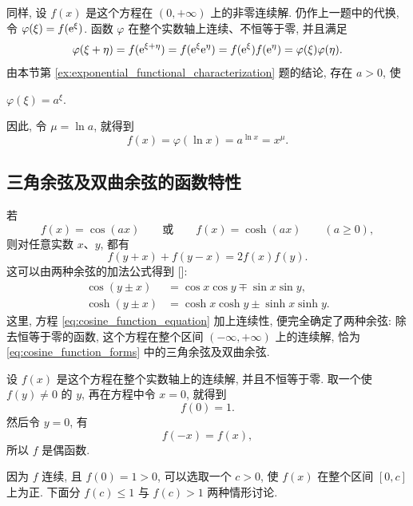 同样, 设 $f(x)$ 是这个方程在 $(0,+\infty)$ 上的非零连续解.
仍作上一题中的代换, 令 $\varphi(\xi)=f(\mathrm{e}^\xi)$.
函数 $\varphi$ 在整个实数轴上连续、不恒等于零, 并且满足
$$
\varphi(\xi+\eta)
=f(\mathrm{e}^{\xi+\eta})=f(\mathrm{e}^\xi\mathrm{e}^\eta)
=f(\mathrm{e}^\xi)f(\mathrm{e}^\eta)=\varphi(\xi)\varphi(\eta).
$$
由本节第 \ref{ex:exponential_functional_characterization} 题的结论,
存在 $a>0$, 使
\begin{center}
$
\varphi(\xi)=a^\xi.
$
\end{center}
因此, 令 $\mu=\ln a$, 就得到
$$
f(x)=\varphi(\ln x)=a^{\ln x}=x^\mu.
$$

\subsection{三角余弦及双曲余弦的函数特性}\label{subsec:76}
\myrefparagraph{4\textdegree}\label{ex:cosine_functional_characterization}
若
\begin{equation}\label{eq:cosine_function_forms}
f(x)=\cos(ax)\qquad\text{或}\qquad f(x)=\cosh(ax)
\qquad(a\geq0),
\tag{e}
\end{equation}
则对任意实数 $x$、$y$, 都有
\begin{equation}\label{eq:cosine_function_equation}
f(y+x)+f(y-x)=2f(x)f(y).
\tag{E}
\end{equation}
这可以由两种余弦的加法公式得到 []:
\begin{align*}
\cos(y\pm x)&=\cos x\cos y\mp\sin x\sin y,\\
\cosh(y\pm x)&=\cosh x\cosh y\pm\sinh x\sinh y.
\end{align*}
这里, 方程 \eqref{eq:cosine_function_equation} 加上连续性,
便完全确定了两种余弦:
{\kaishu 除去恒等于零的函数, 这个方程在整个区间 $(-\infty,+\infty)$ 上的连续解,
恰为 \eqref{eq:cosine_function_forms} 中的三角余弦及双曲余弦.}

设 $f(x)$ 是这个方程在整个实数轴上的连续解, 并且不恒等于零.
取一个使 $f(y)\neq0$ 的 $y$, 再在方程中令 $x=0$, 就得到
\begin{equation}\label{eq:cosine_solution_zero_value}
f(0)=1.
\end{equation}
然后令 $y=0$, 有
\begin{equation}\label{eq:cosine_solution_evenness}
f(-x)=f(x),
\end{equation}
所以 $f$ 是偶函数.

因为 $f$ 连续, 且 $f(0)=1>0$, 可以选取一个 $c>0$,
使 $f(x)$ 在整个区间 $[0,c]$ 上为正.
下面分 $f(c)\leq1$ 与 $f(c)>1$ 两种情形讨论.

